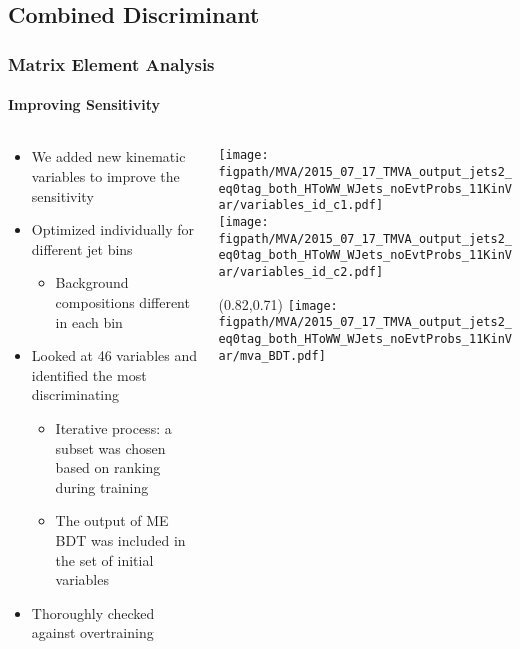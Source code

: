

\subsection*{Combined Discriminant}


\begin{frame}
	\frametitle{Matrix Element Analysis}
	\framesubtitle{Improving Sensitivity}
	\vspace*{-0.24cm}
	\begin{columns}[T]
		\begin{column}{0.47\textwidth}
			\vspace*{-0.15cm}
			\begin{block}{}
				\begin{itemize}
					\item We added new kinematic variables to improve the sensitivity
					\item Optimized individually for different jet bins
					\begin{itemize}
						\item Background compositions different in each bin
					\end{itemize}
					\item Looked at 46 variables and identified the most discriminating
					\begin{itemize}
						\item Iterative process: a subset was chosen based on ranking during training
						\item The output of ME BDT was included in the set of initial variables
					\end{itemize}
					\item Thoroughly checked against overtraining
				\end{itemize}
			\end{block}
		\end{column}
		\begin{column}{0.5\textwidth}
			\vspace*{0.15cm}
			\texttt{[image: \\figpath/MVA/2015\_07\_17\_TMVA\_output\_jets2\_eq0tag\_both\_HToWW\_WJets\_noEvtProbs\_11KinVar/variables\_id\_c1.pdf]}\\
			\texttt{[image: \\figpath/MVA/2015\_07\_17\_TMVA\_output\_jets2\_eq0tag\_both\_HToWW\_WJets\_noEvtProbs\_11KinVar/variables\_id\_c2.pdf]}%
			\begin{textblock}{0.15}(0.82,0.71)
				\texttt{[image: \\figpath/MVA/2015\_07\_17\_TMVA\_output\_jets2\_eq0tag\_both\_HToWW\_WJets\_noEvtProbs\_11KinVar/mva\_BDT.pdf]}%
			\end{textblock}
		\end{column}
	\end{columns}
\end{frame}

